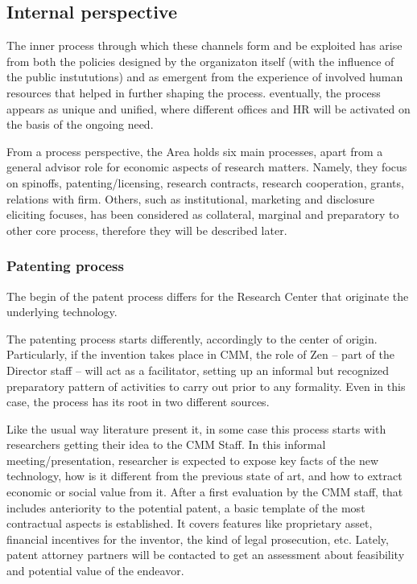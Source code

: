 \subsection{Internal perspective}

The inner process through which these channels form and be exploited has arise from both the policies designed by the organizaton itself (with the influence of the public instututions) and as emergent from the experience of involved human resources that helped in further shaping the process. eventually, the process appears as unique and unified, where different offices and HR will be activated on the basis of the ongoing need. 

From a process perspective, the Area holds six main processes, apart from a general advisor role for economic aspects of research matters. Namely, they focus on spinoffs, patenting/licensing, research contracts, research cooperation, grants, relations with firm. Others, such as institutional, marketing and disclosure eliciting focuses, has been considered as collateral, marginal and preparatory to other core process, therefore they will be described later.

\subsubsection{Patenting process}

The begin of the patent process differs for the Research Center that originate the underlying technology. 

The patenting process starts differently, accordingly to the center of origin. Particularly, if the invention takes place in CMM, the role of Zen – part of the Director staff – will act as a facilitator, setting up an informal but recognized preparatory pattern of activities to carry out prior to any formality. Even in this case, the process has its root in two different sources.

Like the usual way literature present it, in some case this process starts with researchers getting their idea to the CMM Staff. In this informal meeting/presentation, researcher is expected to expose key facts of the new technology, how is it different from the previous state of art, and how to extract economic or social value from it. After a first evaluation by the CMM staff, that includes anteriority to the potential patent, a basic template of the most contractual aspects is established. It covers features like proprietary asset, financial incentives for the inventor, the kind of legal prosecution, etc. Lately, patent attorney partners will be contacted to get an assessment about feasibility and potential value of the endeavor. 

